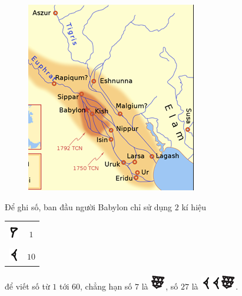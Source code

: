 \begin{multicols}{2}
\begin{figure}[H]
		\includegraphics[width=0.85\linewidth]{17.1}
		\vspace*{-10pt}
	\end{figure}
	Để ghi số, ban đầu người Babylon chỉ sử dụng $2$ kí hiệu 
	\begin{table}[H]
		\vspace*{-5pt}
		\centering
		\begin{tabular}{|c|c|}
			\hline
			& \\[-2.5ex]
			\includegraphics[scale=0.7]{15}&$1$\\
			\hline
			& \\[-2.5ex]
			\includegraphics[scale=0.65]{16}&$10$\\
			\hline
		\end{tabular}
		\vspace*{-10pt}
	\end{table}
	để viết số từ $1$ tới $60$, chẳng hạn số $7$ là  \includegraphics[scale=0.7]{17}, số $27$ là  \includegraphics[scale=0.7]{16}\includegraphics[scale=0.7]{16}\includegraphics[scale=0.7]{17}. 	 

\end{multicols}
